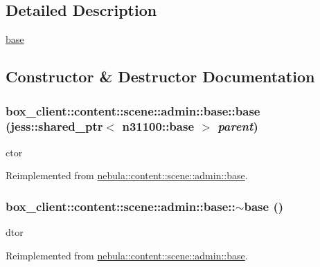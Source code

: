 \subsection{Detailed Description}
\hyperlink{classbox__client_1_1content_1_1scene_1_1admin_1_1base}{base} 

\subsection{Constructor \& Destructor Documentation}
\hypertarget{classbox__client_1_1content_1_1scene_1_1admin_1_1base_a2cd92f663bf7384c9f9799f45b0b03c1}{
\subsubsection[{base}]{\setlength{\rightskip}{0pt plus 5cm}box\_\-client::content::scene::admin::base::base (jess::shared\_\-ptr$<$ {\bf n31100::base} $>$ {\em parent})}}
\label{classbox__client_1_1content_1_1scene_1_1admin_1_1base_a2cd92f663bf7384c9f9799f45b0b03c1}


ctor 

Reimplemented from \hyperlink{classnebula_1_1content_1_1scene_1_1admin_1_1base_a415f430faa5437bfdabe26b23bbbe921}{nebula::content::scene::admin::base}.\hypertarget{classbox__client_1_1content_1_1scene_1_1admin_1_1base_ac32a752d8ba5b54d06a3c5864d3c57f8}{
\subsubsection[{$\sim$base}]{\setlength{\rightskip}{0pt plus 5cm}box\_\-client::content::scene::admin::base::$\sim$base ()}}
\label{classbox__client_1_1content_1_1scene_1_1admin_1_1base_ac32a752d8ba5b54d06a3c5864d3c57f8}


dtor 

Reimplemented from \hyperlink{classnebula_1_1content_1_1scene_1_1admin_1_1base_a5a4364ca7e8636c7c6345162b1fe9879}{nebula::content::scene::admin::base}.

